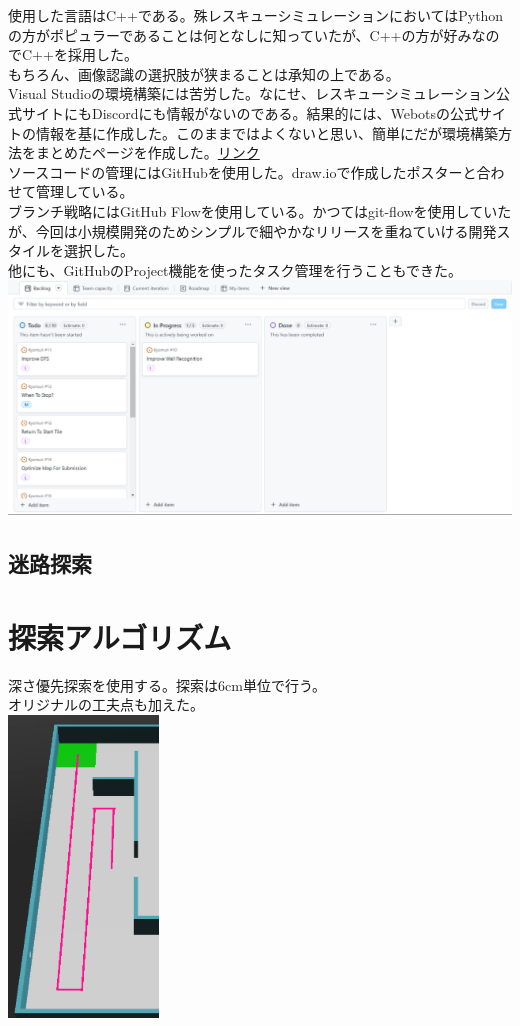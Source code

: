 \documentclass[dvipdfmx,a4paper]{jsarticle}
\begin{document}
    使用した言語はC++である。殊レスキューシミュレーションにおいてはPythonの方がポピュラーであることは何となしに知っていたが、C++の方が好みなのでC++を採用した。\\
    もちろん、画像認識の選択肢が狭まることは承知の上である。\\

    Visual Studioの環境構築には苦労した。なにせ、レスキューシミュレーション公式サイトにもDiscordにも情報がないのである。結果的には、Webotsの公式サイトの情報を基に作成した。このままではよくないと思い、簡単にだが環境構築方法をまとめたページを作成した。\href{https://qiita.com/kikou0517/items/f13045b6b97767e7d0f0}{リンク}\\
    
    ソースコードの管理にはGitHubを使用した。draw.ioで作成したポスターと合わせて管理している。\\
    ブランチ戦略にはGitHub Flowを使用している。かつてはgit-flowを使用していたが、今回は小規模開発のためシンプルで細やかなリリースを重ねていける開発スタイルを選択した。\\
    他にも、GitHubのProject機能を使ったタスク管理を行うこともできた。\\
    \includegraphics[width=150mm]{Photo/1.png}

    \subsection{迷路探索}

  \section{探索アルゴリズム}
  深さ優先探索を使用する。探索は6cm単位で行う。\\
  オリジナルの工夫点も加えた。\\
  \includegraphics[width=40mm]{Photo/feagure1.png}
\end{document}
